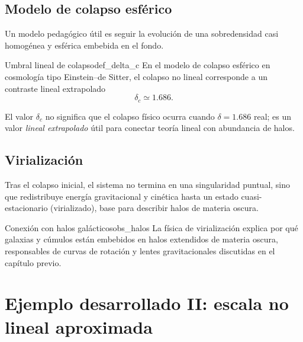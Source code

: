 \subsection{Modelo de colapso esférico}

Un modelo pedagógico útil es seguir la evolución de una sobredensidad casi homogénea y esférica embebida en el fondo.

\begin{definicion}{Umbral lineal de colapso}{def_delta_c}
En el modelo de colapso esférico en cosmología tipo Einstein--de Sitter, el colapso no lineal corresponde a un contraste lineal extrapolado
\begin{equation}
\delta_c\simeq1.686.
\end{equation}
\end{definicion}

\begin{importante}
El valor $\delta_c$ no significa que el colapso físico ocurra cuando $\delta=1.686$ real; es un valor \emph{lineal extrapolado} útil para conectar teoría lineal con abundancia de halos.
\end{importante}

\subsection{Virialización}

Tras el colapso inicial, el sistema no termina en una singularidad puntual, sino que redistribuye energía gravitacional y cinética hasta un estado cuasi-estacionario (virializado), base para describir halos de materia oscura.

\begin{observacion}{Conexión con halos galácticos}{obs_halos}
La física de virialización explica por qué galaxias y cúmulos están embebidos en halos extendidos de materia oscura, responsables de curvas de rotación y lentes gravitacionales discutidas en el capítulo previo.
\end{observacion}

\section{Ejemplo desarrollado II: escala no lineal aproximada}
\label{sec:ejemplo_escala_no_lineal}

